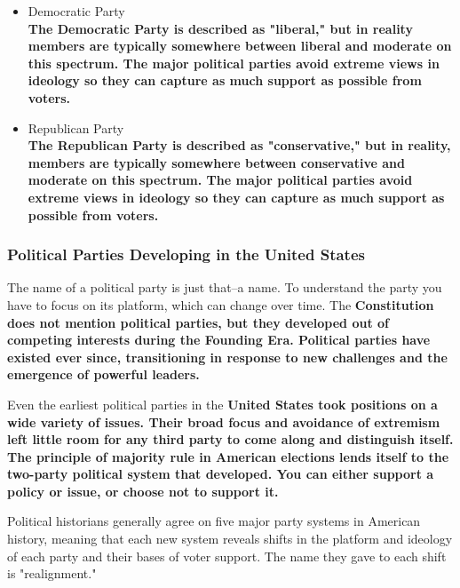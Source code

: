 \begin{itemize}
    \item Democratic Party                          \\
        \bf{The Democratic Party is described as "liberal," but in reality members are typically somewhere between liberal and moderate on this spectrum. The major political parties avoid extreme views in ideology so they can capture as much support as possible from voters.}
    \item Republican Party                          \\
        \bf{The Republican Party is described as "conservative," but in reality, members are typically somewhere between conservative and moderate on this spectrum. The major political parties avoid extreme views in ideology so they can capture as much support as possible from voters.}
\end{itemize}

\subsubsection*{Political Parties Developing in the United States}

The name of a political party is just that–a name. To understand the party you
have to focus on its platform, which can change over time. The \bf{Constitution}
does not mention political parties, but they developed out of competing
interests during the \bf{Founding Era}. Political parties have existed ever
since, transitioning in response to new challenges and the emergence of powerful
leaders.

Even the earliest political parties in the \bf{United States} took positions on
a wide variety of issues. Their broad focus and avoidance of extremism left
little room for any third party to come along and distinguish itself. The
principle of majority rule in American elections lends itself to the two-party
political system that developed. You can either support a policy or issue, or
choose not to support it.

Political historians generally agree on five major party systems in American
history, meaning that each new system reveals shifts in the platform and
ideology of each party and their bases of voter support. The name they gave to
each shift is "realignment."


